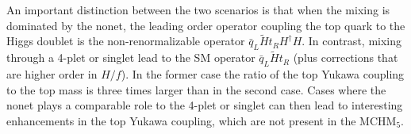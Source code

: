 %
%



An important distinction between the two scenarios is that when the
mixing is dominated by the nonet, the leading order operator coupling
the top quark to the Higgs doublet is the non-renormalizable operator
${\bar q}_L \tilde{H} t_R H^\dagger H$.  In contrast, mixing through a
4-plet or singlet lead to the SM operator ${\bar q}_L \tilde{H} t_R$
(plus corrections that are higher order in $H/f$).  In the former case
the ratio of the top Yukawa coupling to the top mass is three times
larger than in the second case.  Cases where the nonet plays a
comparable role to the 4-plet or singlet can then lead to interesting
enhancements in the top Yukawa coupling, which are not present in the
MCHM$_5$.

